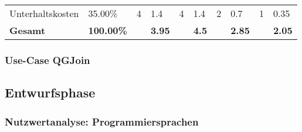 \begin{table}[!htp]
\begin{tabular}{llllllllll}
\rowcolor[HTML]{BBDAFF}
Unterhaltskosten                          & 35.00\%                                 & 4                                                   & 1.4                                    & 4                                                   & 1.4                                    & 2                                                     & 0.7                                    & 1                                         & 0.35                                   \\
\textbf{Gesamt}                           & \textbf{100.00\%}                       & \textbf{}                                           & \textbf{3.95}                          & \textbf{}                                           & \textbf{4.5}                           & \textbf{}                                             & \textbf{2.85}                          & \textbf{}                                 & \textbf{2.05}
\end{tabular}
\end{table}

\subsubsection{Use-Case QGJoin}

\subsection{Entwurfsphase}
\subsubsection{Nutzwertanalyse: Programmiersprachen}

